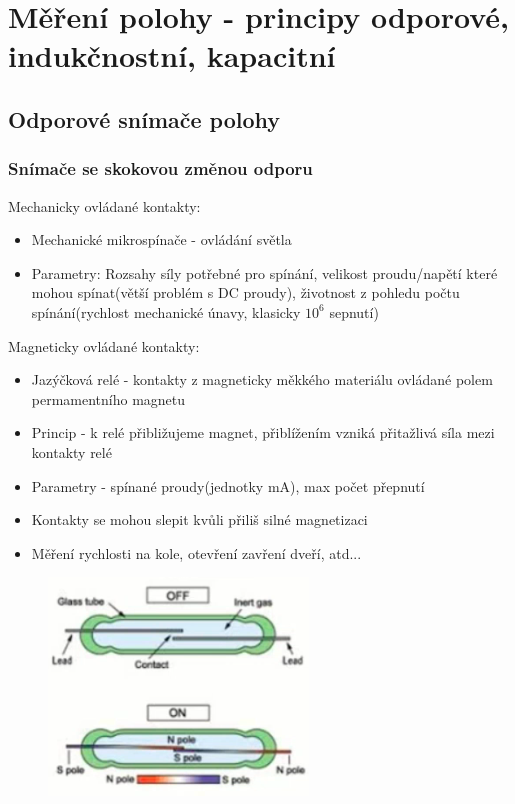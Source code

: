 \section{Měření polohy - principy odporové, indukčnostní, kapacitní}
\subsection{Odporové snímače polohy}

\subsubsection{Snímače se skokovou změnou odporu}
Mechanicky ovládané kontakty:
\begin{itemize}
    \item Mechanické mikrospínače - ovládání světla
    \item Parametry: Rozsahy síly potřebné pro spínání, velikost proudu/napětí které mohou spínat(větší problém s DC proudy), životnost z pohledu počtu spínání(rychlost mechanické únavy, klasicky \(10^6\) sepnutí)
\end{itemize}
Magneticky ovládané kontakty:
\begin{itemize}
    \item Jazýčková relé - kontakty z magneticky měkkého materiálu ovládané polem permamentního magnetu
    \item Princip - k relé přibližujeme magnet, přiblížením vzniká přitažlivá síla mezi kontakty relé
    \item Parametry - spínané proudy(jednotky mA), max počet přepnutí
    \item Kontakty se mohou slepit kvůli přiliš silné magnetizaci
    \item Měření rychlosti na kole, otevření zavření dveří, atd...
\end{itemize}
\begin{figure}[h!]
    \centering
    \includegraphics[scale = 0.5]{img/JazRele.png}
\end{figure}

